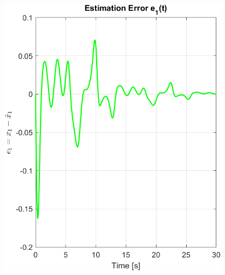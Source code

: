 \documentclass[12pt]{article} %
\numberwithin{equation}{section}  %
\begin{document}
\begin{figure}[ht!]
    \centering
    \begin{minipage}{0.32\textwidth}
        \centering
        \includegraphics[width=0.99\linewidth]{plots/plot2_a_e1.png}
    \end{minipage}
    \hfill
    \begin{minipage}{0.32\textwidth}
        \centering

\end{minipage}
\end{figure}
\end{document}

